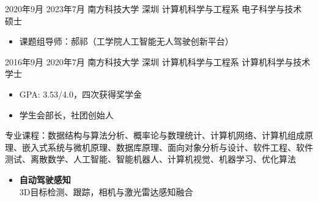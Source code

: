\documentclass[zh]{resume}
\begin{document}
\makeheader

\begin{educations}
  \education%
    {2020年9月}%
    {2023年7月}%
    {南方科技大学}%
    {深圳}%
    {计算机科学与工程系}%
    {电子科学与技术}%
    {硕士}%
	{\begin{itemize}%
		\item 课题组导师：郝祁（工学院人工智能无人驾驶创新平台）
	\end{itemize}
	}%
  \education%
    {2016年9月}%
    {2020年7月}%
    {南方科技大学}%
    {深圳}%
    {计算机科学与工程系}%
    {计算机科学与技术}%
    {学士}%
	{\begin{itemize}%
		\item GPA: 3.53/4.0，四次获得奖学金
		\item 学生会部长，社团创始人
	\end{itemize}
	专业课程：数据结构与算法分析、概率论与数理统计、计算机网络、计算机组成原理、嵌入式系统与微机原理、数据库原理、面向对象分析与设计、软件工程、软件测试、离散数学、人工智能、智能机器人、计算机视觉、机器学习、优化算法
	}%
\end{educations}

\begin{itemize}
  \item \textbf{自动驾驶感知}\\
  	3D目标检测、跟踪，相机与激光雷达感知融合
\end{itemize}

\end{document}
